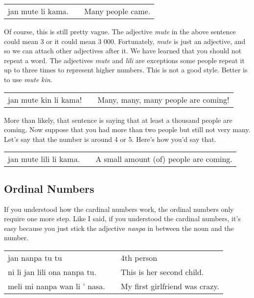 \begin{supertabular}{p{5,5cm}|ll}
jan mute li kama. && Many people came. \\
\end{supertabular} 

Of course, this is still pretty vague. 
The adjective \textit{mute} in the above sentence could mean 3 or it could mean 3 000. 
Fortunately, \textit{mute} is just an adjective, and so we can attach other adjectives after it. 
We have learned that you should not repeat a word. 
The adjectives \textit{mute} and \textit{lili} are exceptions some people repeat it up to three times to represent higher numbers. 
This is not a good style. 
Better is to use \textit{mute kin}. 

\begin{supertabular}{p{5,5cm}|ll}
jan mute kin li kama! && Many, many, many people are coming! \\
\end{supertabular} 

More than likely, that sentence is saying that at least a thousand people are coming.  
Now suppose that you had more than two people but still not very many. 
Let's say that the number is around 4 or 5. Here's how you'd say that. 

\begin{supertabular}{p{5,5cm}|ll}
jan mute lili li kama. && A small amount (of) people are coming. \\
\end{supertabular} 
%
%
\subsection*{Ordinal Numbers}
%
%
If you understood how the cardinal numbers work, the ordinal numbers only require one more step. 
Like I said, if you understood the cardinal numbers, it's easy because you just stick the adjective \textit{nanpa} in between the noun and the number. 

\begin{supertabular}{p{5,5cm}|ll}
jan nanpa tu tu && 4th person \\
ni li jan lili ona nanpa tu. && This is her second child. \\
meli mi nanpa wan li ' nasa. && My first girlfriend was crazy. \\
\end{supertabular} 

